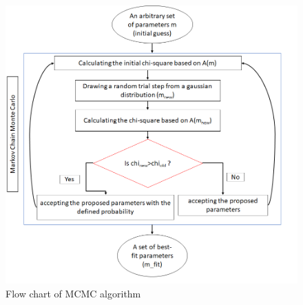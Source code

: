 \documentclass[12pt, TexShade, letterpaper]{report}
\begin{document}
\begin{figure}[h!]
\centering
\includegraphics[scale =0.9]{MCMC_flow.png}
\caption{Flow chart of MCMC algorithm}
\label{fig:MCMC_flow}
\end{figure}
\end{document}
